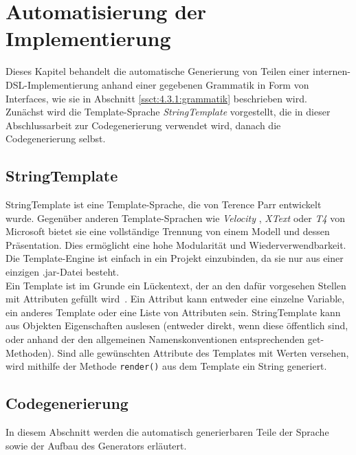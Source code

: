 
\chapter{Automatisierung der Implementierung}\label{chp:5:automatisierung}
Dieses Kapitel behandelt die automatische Generierung von Teilen einer internen-DSL-Implementierung anhand einer gegebenen Grammatik in Form von Interfaces, wie sie in Abschnitt \ref{ssct:4.3.1:grammatik} beschrieben wird.\\
Zunächst wird die Template-Sprache \emph{StringTemplate} vorgestellt, die in dieser Abschlussarbeit zur Codegenerierung verwendet wird, danach die Codegenerierung selbst.

\section{StringTemplate}\label{sct:5.1:st}
StringTemplate \cite{www:stringtemplate} ist eine Template-Sprache, die von Terence Parr entwickelt wurde. Gegenüber anderen Template-Sprachen wie \emph{Velocity} \cite{www:velocity}, \emph{XText} \cite{www:xtext} oder \emph{T4} von Microsoft \cite{www:mst4} bietet sie eine vollständige Trennung von einem Modell und dessen Präsentation. Dies ermöglicht eine hohe Modularität und Wiederverwendbarkeit. Die Template-Engine ist einfach in ein Projekt einzubinden, da sie nur aus einer einzigen .jar-Datei besteht.\\
Ein Template ist \glqq im Grunde ein Lückentext, der an den dafür vorgesehen Stellen mit Attributen gefüllt wird\grqq~\cite{www:stGithub}. Ein Attribut kann entweder eine einzelne Variable, ein anderes Template oder eine Liste von Attributen sein. StringTemplate kann aus Objekten Eigenschaften auslesen (entweder direkt, wenn diese öffentlich sind, oder anhand der den allgemeinen Namenskonventionen entsprechenden get-Methoden). Sind alle gewünschten Attribute des Templates mit Werten versehen, wird mithilfe der Methode \texttt{render()} aus dem Template ein String generiert.

\section{Codegenerierung}\label{sct:5.2:codegenerierung}
In diesem Abschnitt werden die automatisch generierbaren Teile der Sprache sowie der Aufbau des Generators erläutert.

